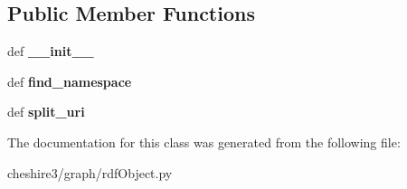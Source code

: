 \subsection*{Public Member Functions}
\begin{DoxyCompactItemize}
\item 
\hypertarget{classcheshire3_1_1graph_1_1rdf_object_1_1_graph_ab6b39d8b6c981190fb1e168a861bf574}{def {\bfseries \-\_\-\-\_\-init\-\_\-\-\_\-}}\label{classcheshire3_1_1graph_1_1rdf_object_1_1_graph_ab6b39d8b6c981190fb1e168a861bf574}

\item 
\hypertarget{classcheshire3_1_1graph_1_1rdf_object_1_1_graph_ad6cc68ef691344ea63b6e36382798c6b}{def {\bfseries find\-\_\-namespace}}\label{classcheshire3_1_1graph_1_1rdf_object_1_1_graph_ad6cc68ef691344ea63b6e36382798c6b}

\item 
\hypertarget{classcheshire3_1_1graph_1_1rdf_object_1_1_graph_a54a87aac7c09ce246b3787127efb602d}{def {\bfseries split\-\_\-uri}}\label{classcheshire3_1_1graph_1_1rdf_object_1_1_graph_a54a87aac7c09ce246b3787127efb602d}

\end{DoxyCompactItemize}


The documentation for this class was generated from the following file\-:\begin{DoxyCompactItemize}
\item 
cheshire3/graph/rdf\-Object.\-py\end{DoxyCompactItemize}

